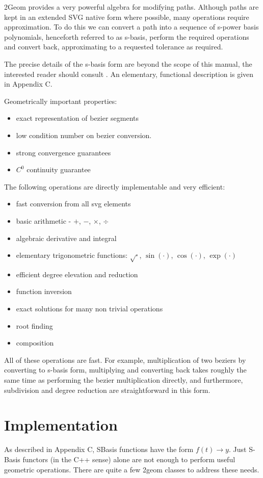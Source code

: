 \documentclass{book}
\begin{document}
2Geom provides a very powerful algebra for modifying paths.  Although
paths are kept in an extended SVG native form where possible, many
operations require approximation.  To do this we can convert a path
into a sequence of s-power basis polynomials, henceforth referred to
as s-basis, perform the required operations and convert back,
approximating to a requested tolerance as required.

The precise details of the s-basis form are beyond the scope of this
manual, the interested reader should consult \cite{SanchezReyes1997,SanchezReyes2000,SanchezReyes2001,SanchezReyes2003,SanchezReyes2004}.
An elementary, functional description is given in Appendix C.

Geometrically important properties:
\begin{itemize}
\item exact representation of bezier segments
\item low condition number on bezier conversion.
\item strong convergence guarantees
\item $C^0$ continuity guarantee
\end{itemize}

The following operations are directly implementable and very efficient:
\begin{itemize}
\item fast conversion from all svg elements
\item basic arithmetic - $+$, $-$, $\times$, $\div$
\item algebraic derivative and integral
\item elementary trigonometric functions: $\sqrt{\cdot}$, $\sin(\cdot)$, $\cos(\cdot)$, $\exp(\cdot)$
\item efficient degree elevation and reduction
\item function inversion
\item exact solutions for many non trivial operations
\item root finding
\item composition
\end{itemize}

All of these operations are fast.  For example, multiplication of two
beziers by converting to s-basis form, multiplying and converting back
takes roughly the same time as performing the bezier multiplication
directly, and furthermore, subdivision and degree reduction are
straightforward in this form.

\section{Implementation}
As described in Appendix C, SBasis functions have the form $f(t) \rightarrow y$.
Just S-Basis functors (in the C++ sense) alone are not enough to perform
useful geometric operations.  There are quite a few 2geom classes to
address these needs.
\end{document}

